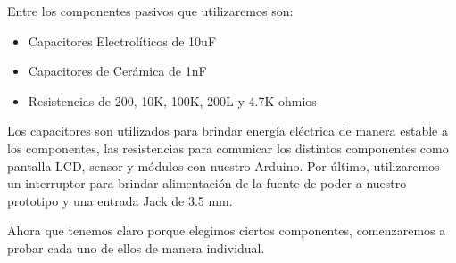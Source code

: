 \par \noindent
Entre los componentes pasivos que utilizaremos son: 

\begin{itemize}
	\item Capacitores Electrolíticos de 10uF
	
	\item Capacitores de Cerámica de 1nF
	
	\item Resistencias de 200, 10K, 100K, 200L y 4.7K ohmios
\end{itemize}

\par \noindent
Los capacitores son utilizados para brindar energía eléctrica de manera estable a los componentes, las resistencias para comunicar los distintos componentes como pantalla LCD, sensor y módulos con nuestro Arduino. Por último, utilizaremos un interruptor para brindar alimentación de la fuente de poder a nuestro prototipo y una entrada Jack de 3.5 mm.

\par \noindent
Ahora que tenemos claro porque elegimos ciertos componentes, comenzaremos a probar cada uno de ellos de manera individual.

